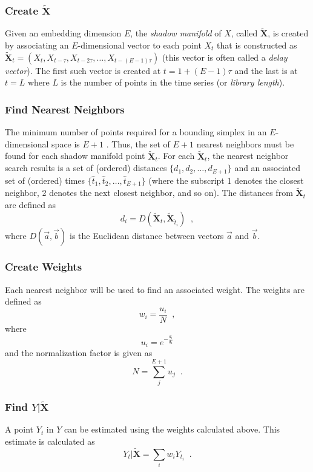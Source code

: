 \documentclass[twocolumn,aps,pre,groupedaddress]{revtex4-1}
\begin{document}
\subsubsection{Create $\tilde{\mathbf{X}}$}
\label{sec:shadow}
Given an embedding dimension $E$, the {\em shadow manifold} of $X$, called $\tilde{\mathbf{X}}$, is created by associating an $E$-dimensional vector to each point $X_t$ that is constructed as $\tilde{\mathbf{X}}_t=\left(X_t,X_{t-\tau},X_{t-2\tau},\ldots,X_{t-(E-1)\tau}\right)$ (this vector is often called a {\em delay vector}).  The first such vector is created at $t=1+(E-1)\tau$ and the last is at $t=L$ where $L$ is the number of points in the time series (or {\em library length}).  

\subsubsection{Find Nearest Neighbors}
The minimum number of points required for a bounding simplex in an $E$-dimensional space is $E+1$ \cite{Sugihara1990,Sugihara1990a}.  Thus,  the set of $E+1$ nearest neighbors must be found for each shadow manifold point $\tilde{\mathbf{X}}_t$.  For each $\tilde{\mathbf{X}}_t$, the nearest neighbor search results is a set of (ordered) distances $\{d_1,d_2,\ldots,d_{E+1}\}$ and an associated set of (ordered) times $\{\hat{t}_1,\hat{t}_2,\ldots,\hat{t}_{E+1}\}$ (where the subscript 1 denotes the closest neighbor, 2 denotes the next closest neighbor, and so on).  The distances from $\tilde{\mathbf{X}}_t$ are defined as
$$
d_i = D\left(\tilde{\mathbf{X}}_t,\tilde{\mathbf{X}}_{\hat{t}_i}\right)\;\;,
$$
where $D(\vec{a},\vec{b})$ is the Euclidean distance between vectors $\vec{a}$ and $\vec{b}$.

\subsubsection{Create Weights}
Each nearest neighbor will be used to find an associated weight.  The weights are defined as
$$
w_i = \frac{u_i}{N}\;\;,
$$
where
$$
u_i = e^{-\frac{d_i}{d_1}}
$$
and the normalization factor is given as
$$
N = \sum_{j}^{E+1} u_j\;\;.
$$

\subsubsection{Find $Y|\tilde{\mathbf{X}}$}
A point $Y_t$ in $Y$ can be estimated using the weights calculated above.  This estimate is calculated as
$$
Y_t|\tilde{\mathbf{X}} = \sum_i w_i Y_{t_i}\;\;.
$$
\end{document}
